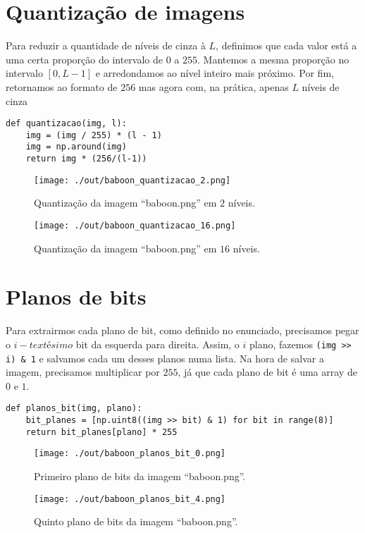 \documentclass[11pt]{article}
\begin{document}
\section*{Quantização de imagens}
\label{sec:org3c06271}
Para reduzir a quantidade de níveis de cinza à \(L\), definimos que cada valor está a uma certa proporção do intervalo de \(0\) a \(255\).
Mantemos a mesma proporção no intervalo \([0, L-1]\) e arredondamos ao nível inteiro mais próximo.
Por fim, retornamos ao formato de \(256\) mas agora com, na prática, apenas \(L\) níveis de cinza
\begin{verbatim}
def quantizacao(img, l):
    img = (img / 255) * (l - 1)
    img = np.around(img)
    return img * (256/(l-1))
\end{verbatim}
\begin{figure}[H]
\centering
\texttt{[image: ./out/baboon\_quantizacao\_2.png]}
\caption{Quantização da imagem ``baboon.png'' em \(2\) níveis.}
\end{figure}
\begin{figure}[H]
\centering
\texttt{[image: ./out/baboon\_quantizacao\_16.png]}
\caption{Quantização da imagem ``baboon.png'' em \(16\) níveis.}
\end{figure}

\section*{Planos de bits}
\label{sec:org90aafa3}
Para extrairmos cada plano de bit, como definido no enunciado, precisamos pegar o \(i-text{ésimo}\) bit da esquerda para direita.
Assim, o \(i\) plano, fazemos \texttt{(img >> i) \& 1} e salvamos cada um desses planos numa lista.
Na hora de salvar a imagem, precisamos multiplicar por \(255\), já que cada plano de bit é uma array de \(0\) e \(1\).
\begin{verbatim}
def planos_bit(img, plano):
    bit_planes = [np.uint8((img >> bit) & 1) for bit in range(8)]
    return bit_planes[plano] * 255
\end{verbatim}
\begin{figure}[H]
\centering
\texttt{[image: ./out/baboon\_planos\_bit\_0.png]}
\caption{Primeiro plano de bits da imagem ``baboon.png''.}
\end{figure}
\begin{figure}[H]
\centering
\texttt{[image: ./out/baboon\_planos\_bit\_4.png]}
\caption{Quinto plano de bits da imagem ``baboon.png''.}
\end{figure}
\end{document}
